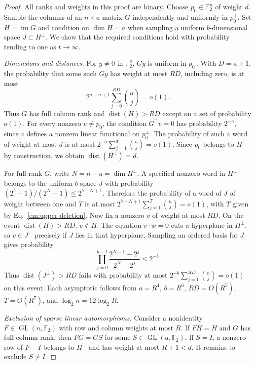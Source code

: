 \documentclass[aps,prl,reprint,notitlepage,nofootinbib,nobibnotes]{revtex4-2}
\begin{document}
\begin{proof}
All ranks and weights in this proof are binary. Choose \(p_0\in\mathbb F_2^n\) of weight \(d\). Sample the columns of an \(n\times a\) matrix \(G\) independently and uniformly in \(p_0^\perp\). Set \(H=\operatorname{im}G\) and condition on \(\dim H=a\) when sampling a uniform \(b\)-dimensional space \(J\subset H^\perp\). We show that the required conditions hold with probability tending to one as \(t\to\infty\).

\emph{Dimensions and distances.}
For \(y\ne0\) in \(\mathbb F_2^a\), \(Gy\) is uniform in \(p_0^\perp\). With \(D=a+1\), the probability that some such \(Gy\) has weight at most \(RD\), including zero, is at most
\[
 2^{a-n+1}\sum_{j=0}^{RD}\binom nj=o(1).
\]
Thus \(G\) has full column rank and \(\operatorname{dist}(H)>RD\) except on a set of probability \(o(1)\). For every nonzero \(v\ne p_0\), the condition \(G^\top v=0\) has probability \(2^{-a}\), since \(v\) defines a nonzero linear functional on \(p_0^\perp\). The probability of such a word of weight at most \(d\) is at most \(2^{-a}\sum_{j=1}^{d}\binom nj=o(1)\). Since \(p_0\) belongs to \(H^\perp\) by construction, we obtain \(\operatorname{dist}(H^\perp)=d\).

For full-rank \(G\), write \(N=n-a=\dim H^\perp\). A specified nonzero word in \(H^\perp\) belongs to the uniform \(b\)-space \(J\) with probability \((2^b-1)/(2^N-1)\le2^{b-N+1}\). Therefore the probability of a word of \(J\) of weight between one and \(T\) is at most \(2^{b-N+1}\sum_{j=1}^{T}\binom nj=o(1)\), with \(T\) given by Eq.~\eqref{em:upper-deletion}. Now fix a nonzero \(v\) of weight at most \(RD\). On the event \(\operatorname{dist}(H)>RD\), \(v\notin H\). The equation \(v\cdot w=0\) cuts a hyperplane in \(H^\perp\), so \(v\in J^\perp\) precisely if \(J\) lies in that hyperplane. Sampling an ordered basis for \(J\) gives probability
\[
 \prod_{j=0}^{b-1}\frac{2^{N-1}-2^j}{2^N-2^j}
 \le 2^{-b}.
\]
Thus \(\operatorname{dist}(J^\perp)>RD\) fails with probability at most \(2^{-b}\sum_{j=1}^{RD}\binom nj=o(1)\) on this event. Each asymptotic follows from \(a=R^4\), \(b=R^6\), \(RD=O(R^5)\), \(T=O(R^7)\), and \(\log_2 n=12\log_2 R\).

\emph{Exclusion of sparse linear automorphisms.}
Consider a nonidentity \(F\in\operatorname{GL}(n,\mathbb F_2)\) with row and column weights at most \(R\). If \(FH=H\) and \(G\) has full column rank, then \(FG=GS\) for some \(S\in\operatorname{GL}(a,\mathbb F_2)\). If \(S=I\), a nonzero row of \(F-I\) belongs to \(H^\perp\) and has weight at most \(R+1<d\). It remains to exclude \(S\ne I\).


\end{proof}
\end{document}
